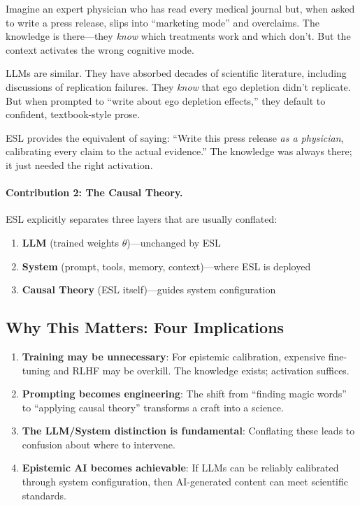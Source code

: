 \documentclass[11pt,a4paper]{article}
\begin{document}
\begin{analogybox}
Imagine an expert physician who has read every medical journal but, when asked to write a press release, slips into ``marketing mode'' and overclaims. The knowledge is there---they \emph{know} which treatments work and which don't. But the context activates the wrong cognitive mode.

LLMs are similar. They have absorbed decades of scientific literature, including discussions of replication failures. They \emph{know} that ego depletion didn't replicate. But when prompted to ``write about ego depletion effects,'' they default to confident, textbook-style prose.

ESL provides the equivalent of saying: ``Write this press release \emph{as a physician}, calibrating every claim to the actual evidence.'' The knowledge was always there; it just needed the right activation.
\end{analogybox}

\paragraph{Contribution 2: The Causal Theory.} ESL explicitly separates three layers that are usually conflated:
\begin{enumerate}
    \item \textbf{LLM} (trained weights $\theta$)---unchanged by ESL
    \item \textbf{System} (prompt, tools, memory, context)---where ESL is deployed
    \item \textbf{Causal Theory} (ESL itself)---guides system configuration
\end{enumerate}


\subsection{Why This Matters: Four Implications}

\begin{enumerate}
    \item \textbf{Training may be unnecessary}: For epistemic calibration, expensive fine-tuning and RLHF may be overkill. The knowledge exists; activation suffices.
    \item \textbf{Prompting becomes engineering}: The shift from ``finding magic words'' to ``applying causal theory'' transforms a craft into a science.
    \item \textbf{The LLM/System distinction is fundamental}: Conflating these leads to confusion about where to intervene.
    \item \textbf{Epistemic AI becomes achievable}: If LLMs can be reliably calibrated through system configuration, then AI-generated content can meet scientific standards.
\end{enumerate}
\end{document}
